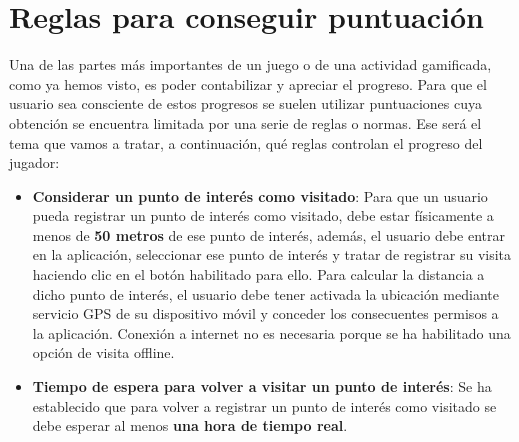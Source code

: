 \section{Reglas para conseguir puntuación}
Una de las partes más importantes de un juego o de una actividad gamificada, como ya hemos visto, es poder contabilizar y apreciar el progreso. Para que el usuario sea consciente de estos progresos se suelen utilizar puntuaciones cuya obtención se encuentra limitada por una serie de reglas o normas. Ese será el tema que vamos a tratar, a continuación, qué reglas controlan el progreso del jugador:
\begin{itemize}
\item \textbf{Considerar un punto de interés como visitado}: Para que un usuario pueda registrar un punto de interés como visitado, debe estar físicamente a menos de \textbf{50 metros} de ese punto de interés, además, el usuario debe entrar en la aplicación, seleccionar ese punto de interés y tratar de registrar su visita haciendo clic en el botón habilitado para ello. Para calcular la distancia a dicho punto de interés, el usuario debe tener activada la ubicación mediante servicio GPS de su dispositivo móvil y conceder los consecuentes permisos a la aplicación. Conexión a internet no es necesaria porque se ha habilitado una opción de visita offline.
\item \textbf{Tiempo de espera para volver a visitar un punto de interés}: Se ha establecido que para volver a registrar un punto de interés como visitado se debe esperar al menos \textbf{una hora de tiempo real}. 
\end{itemize}

